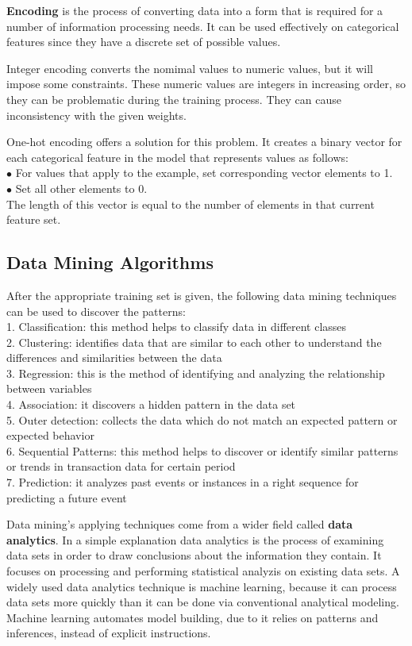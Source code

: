 \textbf{Encoding} is the process of converting data into a form that is  required for a number of information processing needs. It can be used effectively on categorical features since they have a discrete set of possible values. \smallskip

Integer encoding converts the nomimal values to numeric values, but it will impose some constraints. These numeric values are integers in increasing order, so they can be problematic during the training process. They can cause inconsistency with the given weights.\smallskip

One-hot encoding offers a solution for this problem. It creates a binary vector for each categorical feature in the model that represents values as follows:\\
$\bullet$ For values that apply to the example, set corresponding vector elements to 1.\\
$\bullet$ Set all other elements to 0.\\
The length of this vector is equal to the number of elements in that current feature set.


\subsection{Data Mining Algorithms}

After the appropriate training set is given, the following data mining techniques can be used to discover the patterns:\\
1. Classification: this method helps to classify data in different classes\\
2. Clustering: identifies data that are similar to each other to understand the differences and similarities between the data\\
3. Regression: this is the method of identifying and analyzing the relationship between variables\\
4. Association: it discovers a hidden pattern in the data set\\
5. Outer detection: collects the data which do not match an expected pattern or expected behavior\\
6. Sequential Patterns: this method helps to discover or identify similar patterns or trends in transaction data for certain period\\
7. Prediction: it analyzes past events or instances in a right sequence for predicting a future event \medskip

Data mining's applying techniques come from a wider field called \textbf{data analytics}. In a simple explanation data analytics is the process of examining data sets in order to draw conclusions about the information they contain. It focuses on processing and performing statistical analyzis on existing data sets. A widely used data analytics technique is machine learning, because it can process data sets more quickly than it can be done via conventional analytical modeling. Machine learning automates model building, due to it relies on patterns and inferences, instead of explicit instructions.




